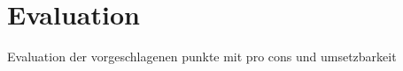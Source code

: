 \chapter{Evaluation}\label{chapter:evaluation}

Evaluation der vorgeschlagenen punkte mit pro cons und umsetzbarkeit\newline




